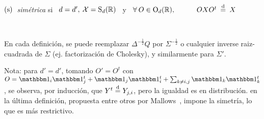 \begin{definicion}
\

\centerline{$(\mathrm{s}) \:$ {\em sim\'etrica} si \ $d = d', \: \mathcal{X} = \mathrm{S}_d(\mathbb{R})$
  \ y \ $\forall \: O \in \mathrm{O}_d(\mathbb{R}), \quad\qquad O X O^t \: \stackrel{\mathrm{d}}{=} \: X$}

\

En   cada  definici\'on,   se   puede  reemplazar   $\Delta^{-\frac12}  Q$   por
$\Sigma^{-\frac12}$    o   cualquier    inverse   raiz-cuadrada    de   $\Sigma$
(ej. factorizaci\'on de Cholesky), y similarmente para $\Sigma'$.
\end{definicion}

Nota: para $d' = d'$, tomando $O' =  O^t$ con $O = \un_i \un_j^t + \un_j \un_i^t
+ \sum_{k \ne i,j} \un_k \un_k^t$,  se observa, por inducci\'on, que $Y^t \stackrel{\mathrm{d}}{=}
Y_{j,i}$, pero  la igualdad es  en distribuci\'on. en la  \'ultima definici\'on,
propuesta entre otros por Mallows~\cite{Mal61},  impone la simetr\'ia, lo que es
m\'as restrictivo.


